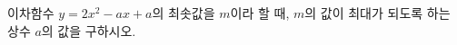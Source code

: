 \hspace*{2mm}\begin{minipage}[t]{\dimexpr\linewidth-2mm\relax}\vspace{0pt}
이차함수 $y=2x^2-ax+a$의 최솟값을 $m$이라 할 때, $m$의 값이 최대가 되도록 하는 상수 $a$의 값을 구하시오.\end{minipage}
